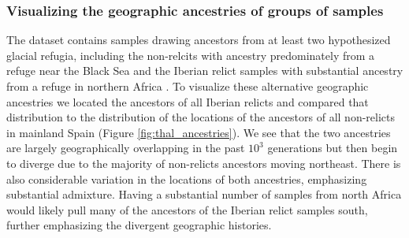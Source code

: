 \documentclass[12pt]{article}
\begin{document}
\subsubsection*{Visualizing the geographic ancestries of groups of samples}

The dataset contains samples drawing ancestors from at least two hypothesized glacial refugia, including the non-relcits with ancestry predominately from a refuge near the Black Sea \citep{lee2017post,hsu2019postglacial} and the Iberian relict samples with substantial ancestry from a refuge in northern Africa \citep{alonso2016,durvasula2017african,fulgione2018madeiran}.
To visualize these alternative geographic ancestries we located the ancestors of all Iberian relicts and compared that distribution to the distribution of the locations of the ancestors of all non-relicts in mainland Spain (Figure \ref{fig:thal_ancestries}).
We see that the two ancestries are largely geographically overlapping in the past $10^3$ generations but then begin to diverge due to the majority of non-relicts ancestors moving northeast.
There is also considerable variation in the locations of both ancestries, emphasizing substantial admixture.
Having a substantial number of samples from north Africa would likely pull many of the  ancestors of the Iberian relict samples south, further emphasizing the divergent geographic histories.

\end{document}
